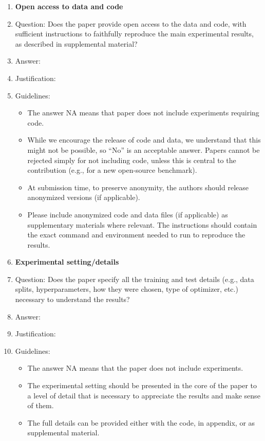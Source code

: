 \documentclass{article}
\begin{document}
\begin{enumerate}
\item {\bf Open access to data and code}
    \item[] Question: Does the paper provide open access to the data and code, with sufficient instructions to faithfully reproduce the main experimental results, as described in supplemental material?
    \item[] Answer: \answerTODO{} %
    \item[] Justification: \justificationTODO{}
    \item[] Guidelines:
    \begin{itemize}
        \item The answer NA means that paper does not include experiments requiring code.
        \item While we encourage the release of code and data, we understand that this might not be possible, so “No” is an acceptable answer. Papers cannot be rejected simply for not including code, unless this is central to the contribution (e.g., for a new open-source benchmark).
        \item At submission time, to preserve anonymity, the authors should release anonymized versions (if applicable).
        \item Please include anonymized code and data files (if applicable) as supplementary materials where relevant. The instructions should contain the exact command and environment needed to run to reproduce the results. 
    \end{itemize}

\item {\bf Experimental setting/details}
    \item[] Question: Does the paper specify all the training and test details (e.g., data splits, hyperparameters, how they were chosen, type of optimizer, etc.) necessary to understand the results?
    \item[] Answer: \answerTODO{} %
    \item[] Justification: \justificationTODO{}
    \item[] Guidelines:
    \begin{itemize}
        \item The answer NA means that the paper does not include experiments.
        \item The experimental setting should be presented in the core of the paper to a level of detail that is necessary to appreciate the results and make sense of them.
        \item The full details can be provided either with the code, in appendix, or as supplemental material.
    \end{itemize}


\end{enumerate}
\end{document}

